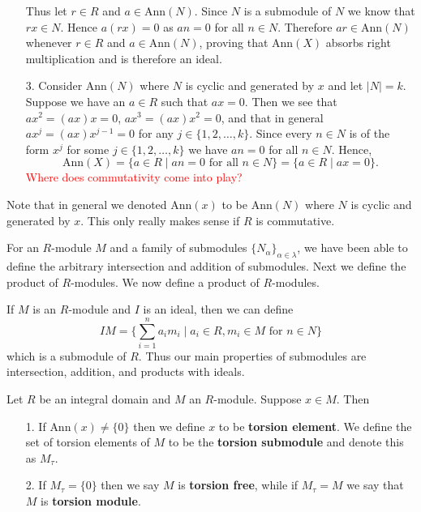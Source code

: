 \documentclass[12pt,letterpaper]{algebra_book}
\newcommand{\ann}{\mbox{Ann}}
\theoremstyle{definition}
\begin{document}
\begin{prf}
\begin{itemize}
        Thus let $r\in R$ and $a \in \ann(N)$. Since $N$ is a
        submodule of $N$ we know 
        that $rx \in N$. Hence $a(rx) = 0$ as $an = 0$ for all $n
        \in N$. Therefore $ar \in \ann(N)$ whenever $r \in R$ and
        $a \in \ann(N)$, proving that $\ann(X)$ absorbs right
        multiplication and is therefore an ideal.

        \item[3.] Consider $\ann(N)$ where $N$ is cyclic and
        generated by $x$ and let $|N| = k$. Suppose we have an $a \in R$ such that
        $ax = 0$. Then we
        see that $ax^2 = (ax)x = 0$, $ax^3 = (ax)x^2 = 0$, and
        that in general $ax^j = (ax)x^{j-1} = 0$ for any $j \in
        \{1, 2, \dots, k\}$. Since every $n \in N$ is of the form
        $x^j$ for some $j \in \{1, 2, \dots, k\}$ we have $an = 0$
        for all $n \in N$. Hence, 
        \[
            \ann(X) = \{a \in R \mid an = 0 \text{ for all } n \in N\} = \{a \in R \mid ax = 0\}.
        \]
        \textcolor{red}{Where does commutativity come into play?}
    \end{itemize}
\end{prf}  
Note that in general we denoted $\ann(x)$ to be $\ann(N)$ where
$N$ is cyclic and generated by $x$. This only really makes sense
if $R$ is commutative.

For an $R$-module $M$ and a family of submodules
$\{N_\alpha\}_{\alpha \in \lambda}$, we have been able to define
the arbitrary intersection and addition of submodules. Next we
define the product of $R$-modules. We now define a product of
$R$-modules. 

If $M$ is an $R$-module and $I$ is an ideal, then we can define 
\[
    IM = \Big\{ \sum_{i = 1}^{n}a_im_i \mid a_i \in R, m_i \in M \text{ for } n \in N \Big\}    
\]
which is a submodule of $R$. Thus our main properties of
submodules are intersection, addition, and products with ideals. 

\begin{definition}
    Let $R$ be an integral domain and $M$ an $R$-module. Suppose
    $x \in M$. Then
    \begin{itemize}
        \item[1.] If $\ann(x) \ne \{0\}$ then we define $x$ to be
        \textbf{torsion element}. We define the set of torsion
        elements of $M$ to be the \textbf{torsion submodule} and
        denote this as $M_{\tau}$.
        \item[2.] If $M_\tau = \{0\}$ then we say $M$ is
        \textbf{torsion free}, while if $M_\tau = M$ we say that
        $M$ is \textbf{torsion module}.
    \end{itemize}
\end{definition}
\end{document}
